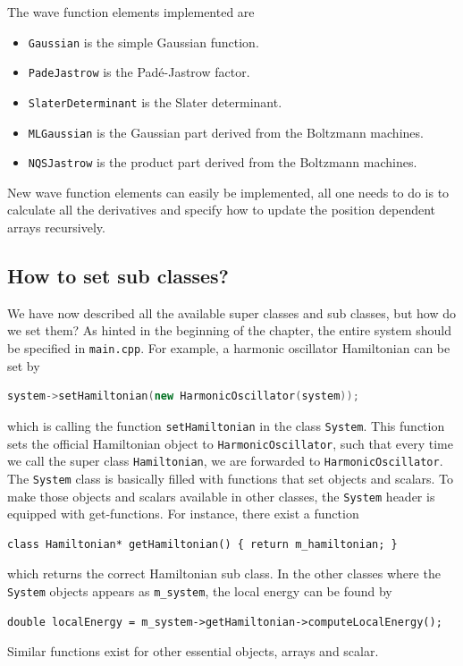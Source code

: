 The wave function elements implemented are 
\begin{itemize}
	\item \texttt{Gaussian} is the simple Gaussian function.
	\item \texttt{PadeJastrow} is the Padé-Jastrow factor.
	\item \texttt{SlaterDeterminant} is the Slater determinant.
	\item \texttt{MLGaussian} is the Gaussian part derived from the Boltzmann machines.
	\item \texttt{NQSJastrow} is the product part derived from the Boltzmann machines. 
\end{itemize}

New wave function elements can easily be implemented, all one needs to do is to calculate all the derivatives and specify how to update the position dependent arrays recursively. 

\subsection{How to set sub classes?}
We have now described all the available super classes and sub classes, but how do we set them? As hinted in the beginning of the chapter, the entire system should be specified in \texttt{main.cpp}. For example, a harmonic oscillator Hamiltonian can be set by
\begin{lstlisting}[language=c++]
system->setHamiltonian(new HarmonicOscillator(system));
\end{lstlisting}
which is calling the function \texttt{setHamiltonian} in the class \texttt{System}. This function sets the official Hamiltonian object to \texttt{HarmonicOscillator}, such that every time we call the super class \texttt{Hamiltonian}, we are forwarded to \texttt{HarmonicOscillator}. The \texttt{System} class is basically filled with functions that set objects and scalars. To make those objects and scalars available in other classes, the \texttt{System} header is equipped with get-functions. For instance, there exist a function 
\begin{lstlisting}
class Hamiltonian* getHamiltonian() { return m_hamiltonian; }
\end{lstlisting}
which returns the correct Hamiltonian sub class. In the other classes where the \texttt{System} objects appears as \texttt{m\_system}, the local energy can be found by
\begin{lstlisting}
double localEnergy = m_system->getHamiltonian->computeLocalEnergy();
\end{lstlisting}
Similar functions exist for other essential objects, arrays and scalar. 

